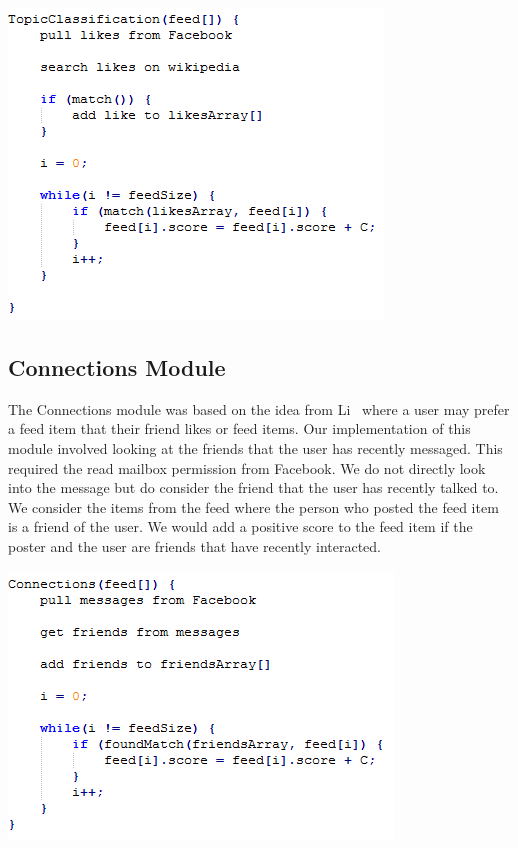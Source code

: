 \begin{center}
\includegraphics[scale=0.8]{images/topicClassification.png}
\end{center}

\subsection{Connections Module}
The Connections module was based on the idea from Li~\cite{LiTiaLee2010} where a user may prefer a feed item that their friend likes or feed items. Our implementation of this module involved looking at the friends that the user has recently messaged. This required the read mailbox permission from Facebook. We do not directly look into the message but do consider the friend that the user has recently talked to. We consider the items from the feed where the person who posted the feed item is a friend of the user. We would add a positive score to the feed item if the poster and the user are friends that have recently interacted.

\begin{center}
\includegraphics[scale=0.8]{images/connections.png}
\end{center}

